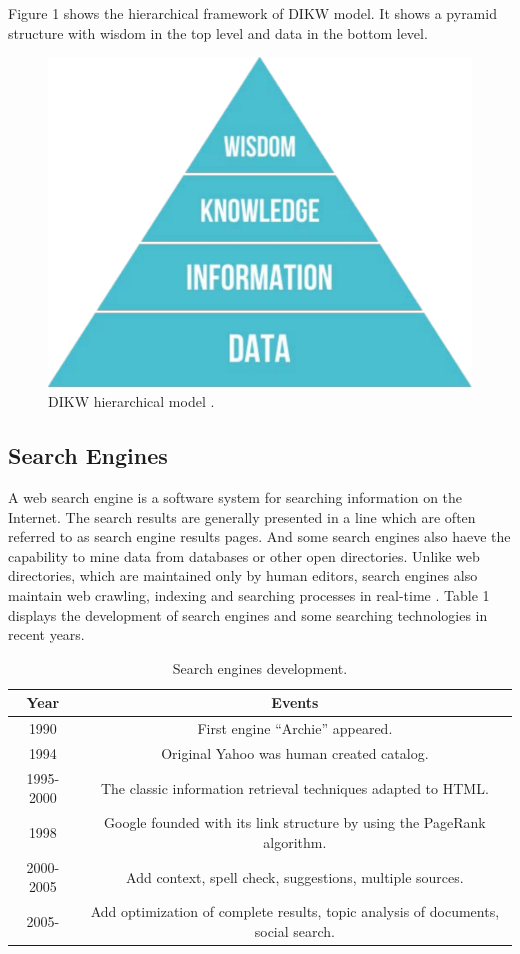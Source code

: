 \documentclass[sigconf]{acmart}
\begin{document}
Figure 1 shows the hierarchical framework of DIKW model. It shows a pyramid structure with wisdom in the top level and data in the bottom level.
\begin{figure}
\includegraphics[width=0.30\columnwidth]{images/DIKW_Pyramid}
\caption{DIKW hierarchical model \cite{editor06}.}
\end{figure}

\subsection{Search Engines}

A web search engine is a software system for searching information on the Internet. The search results are generally presented in a line which are often referred to as search engine results pages. And some search engines also haeve the capability to mine data from databases or other open directories. Unlike web directories, which are maintained only by human editors, search engines also maintain web crawling, indexing and searching processes in real-time \cite{editor05}. Table 1 displays the development of search engines and some searching technologies in recent years.
\begin{table}[htb]
\centering
\begin{tabular}{|c|c|} \hline
\textsf{Year} & \textsf{Events} \\ \hline
1990 & First engine ``Archie'' appeared. \\ \hline
1994 & Original Yahoo was human created catalog. \\ \hline
1995-2000 & The classic information retrieval techniques adapted to HTML. \\ \hline 
1998 & Google founded with its link structure by using the PageRank algorithm. \\ \hline
2000-2005 & Add context, spell check, suggestions, multiple sources. \\ \hline
2005- & Add optimization of complete results, topic analysis of documents, social search. \\ \hline
\end{tabular}
\caption{Search engines development.}
\end{table}
\end{document}
